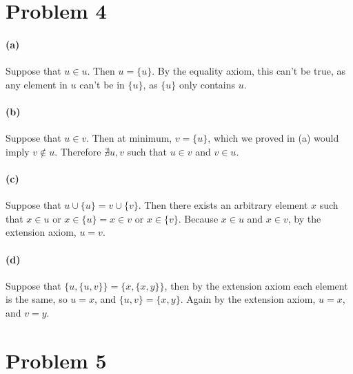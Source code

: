 \documentclass[10pt,letter]{article}
\begin{document}
\section*{Problem 4}

\paragraph{(a)} Suppose that $u \in u$. Then $u = \{u\}$. By the equality axiom, this can't be true, as any element in $u$ can't be in $\{u\}$, as $\{u\}$ only contains $u$.

\paragraph{(b)} Suppose that $u \in v$. Then at minimum, $v = \{u\}$, which we proved in (a) would imply $v \notin u$. Therefore $\nexists u,v$ such that $u \in v$ and $v \in u$.

\paragraph{(c)} Suppose that $u \cup \{u\} = v \cup \{v\}$. Then there exists an arbitrary element $x$ such that $x \in u$ or $x \in \{u\} =  x \in v$ or $x \in \{v\}$. Because $x \in u$ and $x \in v$, by the extension axiom, $u = v$. 

\paragraph{(d)} Suppose that $\{u, \{u, v\}\} = \{x, \{x, y\}\}$, then by the extension axiom each element is the same, so $u = x$, and $\{u, v\} = \{x, y\}$. Again by the extension axiom, $u = x$, and $v = y$.


\section*{Problem 5}
\end{document}
